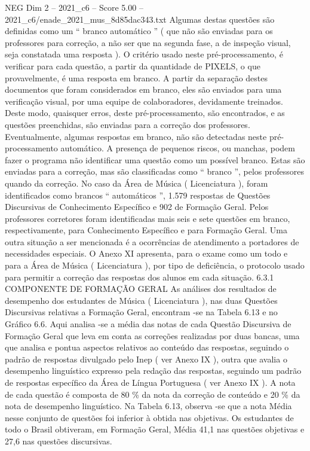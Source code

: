 \begin{textsample}{NEG Dim 2 – 2021\_c6 – Score 5.00 – 2021\_c6/enade\_2021\_mus\_8d85dac343.txt}
Algumas destas questões são definidas como um “ branco automático ” ( que não são enviadas para os professores para correção, a não ser que na segunda fase, a de inspeção visual, seja constatada uma resposta ).
O critério usado neste pré-processamento, é verificar para cada questão, a partir da quantidade de PIXELS, o que provavelmente, é uma resposta em branco.
A partir da separação destes documentos que foram considerados em branco, eles são enviados para uma verificação visual, por uma equipe de colaboradores, devidamente treinados.
Deste modo, quaisquer erros, deste pré-processamento, são encontrados, e as questões preenchidas, são enviadas para a correção dos professores.
Eventualmente, algumas respostas em branco, não são detectadas neste pré-processamento automático.
A presença de pequenos riscos, ou manchas, podem fazer o programa não identificar uma questão como um possível branco.
Estas são enviadas para a correção, mas são classificadas como “ branco ”, pelos professores quando da correção.
No caso da Área de Música ( Licenciatura ), foram identificados como brancos “ automáticos ”, 1.579 respostas de Questões Discursivas de Conhecimento Específico e 902 de Formação Geral.
Pelos professores corretores foram identificadas mais seis e sete questões em branco, respectivamente, para Conhecimento Específico e para Formação Geral.
Uma outra situação a ser mencionada é a ocorrências de atendimento a portadores de necessidades especiais.
O Anexo XI apresenta, para o exame como um todo e para a Área de Música ( Licenciatura ), por tipo de deficiência, o protocolo usado para permitir a correção das respostas dos alunos em cada situação. 6.3.1 COMPONENTE DE FORMAÇÃO GERAL As análises dos resultados de desempenho dos estudantes de Música ( Licenciatura ), nas duas Questões Discursivas relativas a Formação Geral, encontram -se na Tabela 6.13 e no Gráfico 6.6.
Aqui analisa -se a média das notas de cada Questão Discursiva de Formação Geral que leva em conta as correções realizadas por duas bancas, uma que analisa e pontua aspectos relativos ao conteúdo das respostas, seguindo o padrão de respostas divulgado pelo Inep ( ver Anexo IX ), outra que avalia o desempenho linguístico expresso pela redação das respostas, seguindo um padrão de respostas específico da Área de Língua Portuguesa ( ver Anexo IX ).
A nota de cada questão é composta de 80 \% da nota da correção de conteúdo e 20 \% da nota de desempenho linguístico.
Na Tabela 6.13, observa -se que a nota Média nesse conjunto de questões foi inferior à obtida nas objetivas.
Os estudantes de todo o Brasil obtiveram, em Formação Geral, Média 41,1 nas questões objetivas e 27,6 nas questões discursivas.

\end{textsample}
